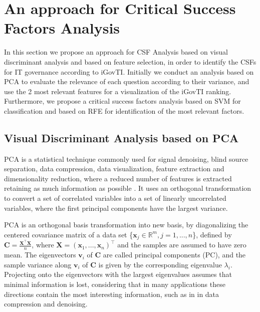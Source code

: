 \section{An approach for Critical Success Factors Analysis}
\label{sec:b_csf_fs}

In this section we propose an approach for CSF Analysis based on visual discriminant analysis and based on feature selection, in order to identify the CSFs for IT governance according to iGovTI. Initially we conduct an analysis based on PCA to evaluate the relevance of each question according to their variance, and use the 2 most relevant features for a visualization of the iGovTI ranking. Furthermore, we propose a critical success factors analysis based on SVM for classification and based on RFE for identification of the most relevant factors.

\subsection{Visual Discriminant Analysis based on PCA}
\label{sec:b_pca}

PCA is a statistical technique commonly used for signal denoising, blind source separation, data compression, data visualization, feature extraction and dimensionality reduction, where a reduced number of features is extracted retaining as much information as possible \cite{jolliffe1986principal}. It uses an orthogonal transformation to convert a set of correlated variables into a set of linearly uncorrelated variables, where the first principal components have the largest variance.

PCA is an orthogonal basis transformation into new basis, by diagonalizing the centered covariance matrix of a data set \{$\mathbf{x}_j \in \mathbb{R}^m, j = 1, ... ,n$\}, defined by $\mathbf{C} = \frac{\mathbf{X}^\intercal\mathbf{X}}{n}$, where $\mathbf{X} = (\mathbf{x}_1, ... , \mathbf{x}_n)^\intercal$ and the samples are assumed to have zero mean. The eigenvectors $\mathbf{v}_i$ of $\mathbf{C}$ are called principal components (PC), and the sample variance along $\mathbf{v}_i$ of $\mathbf{C}$ is given by the corresponding eigenvalue $\lambda_i$. Projecting onto the eigenvectors with the largest eigenvalues assumes that minimal information is lost, considering that in many applications these directions contain the most interesting information, such as in in data compression and denoising.

